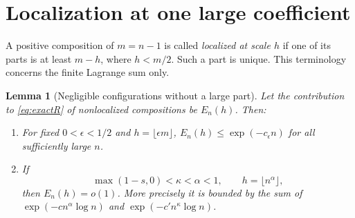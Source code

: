 \documentclass[11pt,a4paper]{article}
\newtheorem{lemma}[theorem]{Lemma}
\theoremstyle{definition}
\theoremstyle{remark}
\numberwithin{equation}{section}
\begin{document}
\section{Localization at one large coefficient}\label{sec:giant}

A positive composition of $m=n-1$ is called \emph{localized at scale $h$}
if one of its parts is at least $m-h$, where $h<m/2$. Such a part is
unique. This terminology concerns the finite Lagrange sum only.

\begin{lemma}[Negligible configurations without a large part]
\label{lem:localization}
Let the contribution to \eqref{eq:exactR} of nonlocalized compositions
be $E_n(h)$. Then:
\begin{enumerate}[label=(\roman*),leftmargin=9mm]
\item For fixed $0<\epsilon<1/2$ and $h=\lfloor\epsilon m\rfloor$,
$E_n(h)\le\exp(-c_\epsilon n)$ for all sufficiently large $n$.
\item If
\begin{equation}
 \max(1-s,0)<\kappa<\alpha<1,\qquad h=\lfloor n^\alpha\rfloor,
 \label{eq:localpowers}
\end{equation}
then $E_n(h)=o(1)$. More precisely it is bounded by the sum of
$\exp(-c n^\alpha\log n)$ and $\exp(-c' n^\kappa\log n)$.
\end{enumerate}
\end{lemma}
\end{document}
